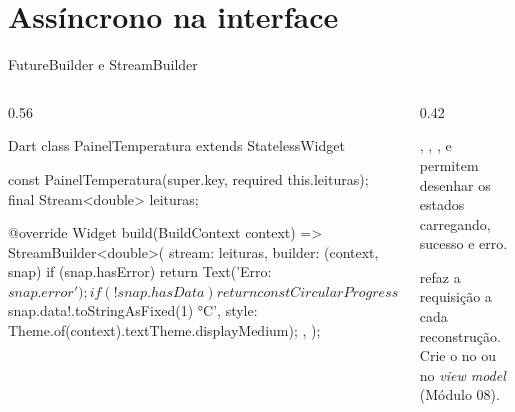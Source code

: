 \documentclass[aspectratio=169,10pt]{beamer}
\begin{document}
\section{Assíncrono na interface}

\begin{frame}[fragile]{FutureBuilder e StreamBuilder}
  \begin{columns}[T]
    \begin{column}{0.56\textwidth}
\begin{codigo}[title=Painel em tempo real]{Dart}
class PainelTemperatura extends StatelessWidget {
  const PainelTemperatura({super.key, required this.leituras});
  final Stream<double> leituras;

  @override
  Widget build(BuildContext context) => StreamBuilder<double>(
    stream: leituras,
    builder: (context, snap) {
      if (snap.hasError) return Text('Erro: ${snap.error}');
      if (!snap.hasData) {
        return const CircularProgressIndicator();
      }
      return Text('${snap.data!.toStringAsFixed(1)} °C',
          style: Theme.of(context).textTheme.displayMedium);
    },
  );
}
\end{codigo}
    \end{column}
    \begin{column}{0.42\textwidth}
      \begin{conceito}
        , , ,  e  permitem desenhar os estados carregando, sucesso e erro.
      \end{conceito}
      \begin{erro}
         refaz a requisição a cada reconstrução. Crie o  no  ou no \emph{view model} (Módulo 08).
      \end{erro}
    \end{column}
  \end{columns}
\end{frame}
\end{document}

